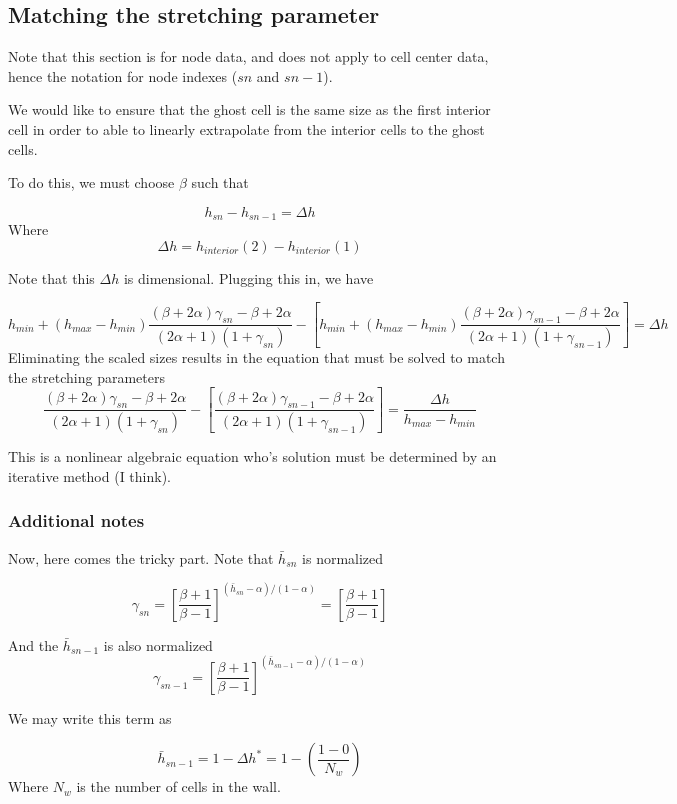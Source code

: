 \documentclass[11pt]{article}
\begin{document}
\subsection{Matching the stretching parameter}
Note that this section is for node data, and does not apply to cell center data, hence the notation for node indexes ($sn$ and $sn-1$).

We would like to ensure that the ghost cell is the same size as the first interior cell in order to able to linearly extrapolate from the interior cells to the ghost cells.

To do this, we must choose $\beta$ such that

\begin{equation}
	h_{sn} - h_{sn-1} = \Delta h
\end{equation}
Where
\begin{equation}
	\Delta h = h_{interior}(2) - h_{interior}(1)
\end{equation}

Note that this $\Delta h$ is dimensional. Plugging this in, we have

\begin{equation}
	h_{min} + (h_{max}-h_{min}) \frac{(\beta+2\alpha)\gamma_{sn} - \beta + 2\alpha}{(2\alpha+1)(1+\gamma_{sn})}
	-
	\left[
	h_{min} + (h_{max}-h_{min}) \frac{(\beta+2\alpha)\gamma_{sn-1} - \beta + 2\alpha}{(2\alpha+1)(1+\gamma_{sn-1})}
	\right]
	=
	\Delta h
\end{equation}
Eliminating the scaled sizes results in the equation that must be solved to match the stretching parameters
\begin{equation}
	\boxed{
	\frac{(\beta+2\alpha)\gamma_{sn} - \beta + 2\alpha}{(2\alpha+1)(1+\gamma_{sn})}
	-
	\left[
	\frac{(\beta+2\alpha)\gamma_{sn-1} - \beta + 2\alpha}{(2\alpha+1)(1+\gamma_{sn-1})}
	\right]
	=
	\frac{\Delta h}{h_{max}-h_{min}}
	}
\end{equation}

This is a nonlinear algebraic equation who's solution must be determined by an iterative method (I think).

\subsubsection{Additional notes}
Now, here comes the tricky part.
Note that $\bar{h}_{sn}$ is normalized

\begin{equation}
	\gamma_{sn} = \left[ 
	\frac{\beta+1}{\beta-1}
	\right]^{(\bar{h}_{sn}-\alpha)/(1-\alpha)} = 
	\left[ 
	\frac{\beta+1}{\beta-1}
	\right]
\end{equation}


And the $\bar{h}_{sn-1}$ is also normalized
\begin{equation}
	\gamma_{sn-1} = \left[ 
	\frac{\beta+1}{\beta-1}
	\right]^{(\bar{h}_{sn-1}-\alpha)/(1-\alpha)}
\end{equation}

We may write this term as

\begin{equation}
	\bar{h}_{sn-1} = 1 - \Delta h^* = 1 - \left( \frac{1-0}{N_w} \right)
\end{equation}
Where $N_w$ is the number of cells in the wall.
\end{document}
